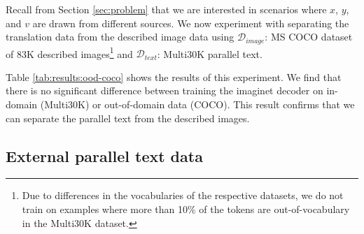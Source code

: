Recall from Section \ref{sec:problem} that we are interested in scenarios where $x$, $y$, and $v$ are drawn from different sources. We now experiment with separating the translation data from the described image data using $\mathcal{D}_{image}$: MS COCO dataset of 83K described images\footnote{Due to differences in the vocabularies of the respective datasets, we do not train on examples where more than 10\% of the tokens are out-of-vocabulary in the Multi30K dataset.} and $\mathcal{D}_{text}$: Multi30K parallel text.

Table \ref{tab:results:ood-coco} shows the results of this experiment.
We find that there is no significant difference between training the {\sc imaginet} decoder on in-domain (Multi30K) or out-of-domain data (COCO). This result confirms that we can separate the parallel text from the described images.

\subsection{External parallel text data}



